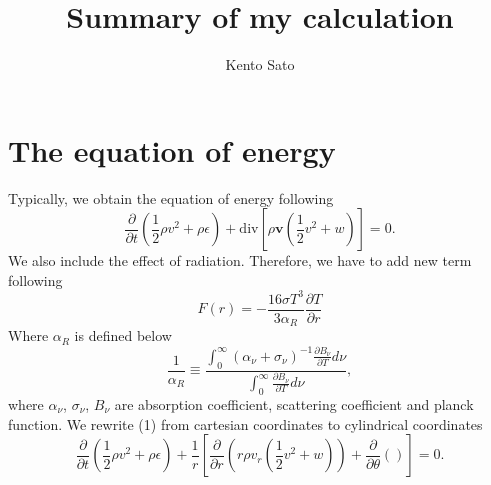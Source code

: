 \documentclass{article}
\title{Summary of my calculation}
\author{Kento Sato}
\begin{document}
  \section{The equation of energy}
  Typically, we obtain the equation of energy following
  \begin{equation}
    \frac{\partial}{\partial t}\left(\frac{1}{2}\rho v^2+\rho\epsilon\right)+\mathrm{div}\left[\rho\bm{v}\left(\frac{1}{2}v^2+w\right)\right]=0.
  \end{equation}
  We also include the effect of radiation. Therefore, we have to add new term following
  \begin{equation}
    F(r)=-\frac{16\sigma T^3}{3\alpha_{R}}\frac{\partial T}{\partial r}
  \end{equation}
  Where $\alpha_R$ is defined below
  \begin{equation}
    \frac{1}{\alpha_R}\equiv\frac{\int_0^\infty (\alpha_\nu+\sigma_\nu)^{-1}\frac{\partial B_\nu}{\partial T}d\nu}{\int_0^\infty \frac{\partial B_\nu}{\partial T}d\nu},
  \end{equation}
  where $\alpha_\nu$, $\sigma_\nu$, $B_\nu$ are absorption coefficient, scattering coefficient and planck function.
  We rewrite (1) from cartesian coordinates to cylindrical coordinates
  \begin{equation}
    \frac{\partial}{\partial t}\left(\frac{1}{2}\rho v^2+\rho\epsilon\right)+\frac{1}{r}\left[\frac{\partial}{\partial r}\left(r\rho v_r\left(\frac{1}{2}v^2+w\right)\right)+\frac{\partial}{\partial \theta}\left(\right)\right]=0.
  \end{equation}
\end{document}
